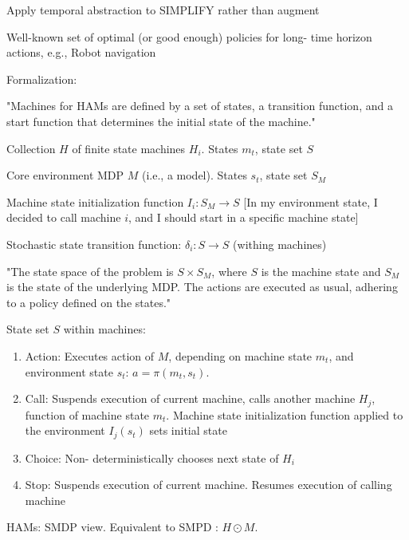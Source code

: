 \documentclass[english]{article}
\begin{document}
Apply temporal abstraction to
SIMPLIFY rather than augment

Well-known set of optimal (or
good enough) policies for long-
time horizon actions, e.g., Robot navigation

\item Formalization: 

"Machines for HAMs are defined by a set of states, a transition function, and a
start function that determines the initial state of the machine."

\benum 

\item
Collection $H$ of finite state machines $H_i$. States $m_t$, state set $S$
\item
Core environment MDP $M$ (i.e., a model). States $s_t$, state set $S_M$
\item
Machine state initialization function $I_i: S_M\to S$ [In my environment state, I decided to call machine $i$, and I should start in a specific machine state]
\item
Stochastic state transition function: $\delta_i: S\to S$ (withing machines)
\item

"The state space of the problem is $S \times S_M$, where $S$ is the machine state and $S_M$ is the state of the underlying MDP. The actions are executed as usual, adhering to a policy defined on the states."
\eenum 


State set $S$ within machines:

\begin{enumerate}
\item Action: Executes action of $M$, depending on machine state $m_t$, and environment state $s_t$: $a = \pi(m_t, s_t)$. 

\item Call: Suspends execution
of current machine,
calls another
machine $H_j$, function
of machine state $m_t$.
Machine state initialization function applied to the environment $I_j(s_t)$ sets initial
state

\item Choice: Non-
deterministically
chooses next
state of $H_i$

\item Stop: Suspends execution
of current machine.
Resumes execution
of calling machine


\end{enumerate}

\item HAMs: SMDP view. Equivalent to SMPD : $H \odot M$. 
\end{document}
